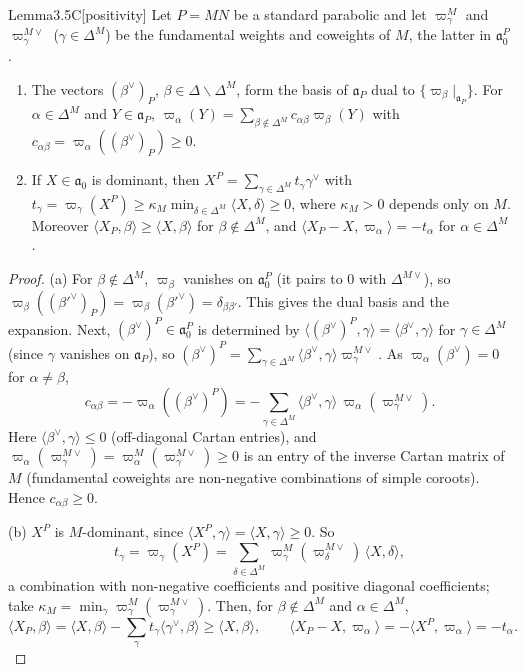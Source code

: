 \documentclass[12pt,letterpaper]{article}
\numberwithin{equation}{section}
\theoremstyle{plain}
\theoremstyle{remark}
\theoremstyle{plain}
\theoremstyle{definition}
\theoremstyle{remark}
\theoremstyle{remark}
\newcommand{\fa}{\mathfrak{a}}
\newcommand{\ip}[1]{\langle #1\rangle}
\begin{document}
\begin{fixedplain}{Lemma}{3.5C}[positivity]\label{lem:3.5C}
Let $P=MN$ be a standard parabolic and let $\varpi^{M}_\gamma$ and $\varpi^{M\vee}_\gamma$ ($\gamma\in\Delta^M$) be the fundamental weights and coweights of $M$, the latter in $\fa_0^P$.
\begin{enumerate}[label=(\alph*)]
\item The vectors $(\beta^\vee)_P$, $\beta\in\Delta\smallsetminus\Delta^M$, form the basis of $\fa_P$ dual to $\{\varpi_\beta|_{\fa_P}\}$. For $\alpha\in\Delta^M$ and $Y\in\fa_P$, $\varpi_\alpha(Y)=\sum_{\beta\notin\Delta^M}c_{\alpha\beta}\varpi_\beta(Y)$ with $c_{\alpha\beta}=\varpi_\alpha((\beta^\vee)_P)\ge0$.
\item If $X\in\fa_0$ is dominant, then $X^P=\sum_{\gamma\in\Delta^M}t_\gamma\gamma^\vee$ with $t_\gamma=\varpi_\gamma(X^P)\ge\kappa_M\min_{\delta\in\Delta^M}\ip{X,\delta}\ge0$, where $\kappa_M>0$ depends only on $M$. Moreover $\ip{X_P,\beta}\ge\ip{X,\beta}$ for $\beta\notin\Delta^M$, and $\ip{X_P-X,\varpi_\alpha}=-t_\alpha$ for $\alpha\in\Delta^M$.
\end{enumerate}
\end{fixedplain}

\begin{proof}
(a) For $\beta\notin\Delta^M$, $\varpi_\beta$ vanishes on $\fa_0^P$ (it pairs to $0$ with $\Delta^{M\vee}$), so $\varpi_\beta((\beta'^\vee)_P)=\varpi_\beta(\beta'^\vee)=\delta_{\beta\beta'}$. This gives the dual basis and the expansion. Next, $(\beta^\vee)^P\in\fa_0^P$ is determined by $\ip{(\beta^\vee)^P,\gamma}=\ip{\beta^\vee,\gamma}$ for $\gamma\in\Delta^M$ (since $\gamma$ vanishes on $\fa_P$), so $(\beta^\vee)^P=\sum_{\gamma\in\Delta^M}\ip{\beta^\vee,\gamma}\varpi^{M\vee}_\gamma$. As $\varpi_\alpha(\beta^\vee)=0$ for $\alpha\ne\beta$,
\[
c_{\alpha\beta}=-\varpi_\alpha((\beta^\vee)^P)=-\sum_{\gamma\in\Delta^M}\ip{\beta^\vee,\gamma}\,\varpi_\alpha(\varpi^{M\vee}_\gamma).
\]
Here $\ip{\beta^\vee,\gamma}\le0$ (off-diagonal Cartan entries), and $\varpi_\alpha(\varpi^{M\vee}_\gamma)=\varpi^M_\alpha(\varpi^{M\vee}_\gamma)\ge0$ is an entry of the inverse Cartan matrix of $M$ (fundamental coweights are non-negative combinations of simple coroots). Hence $c_{\alpha\beta}\ge0$.

(b) $X^P$ is $M$-dominant, since $\ip{X^P,\gamma}=\ip{X,\gamma}\ge0$. So
\[
t_\gamma=\varpi_\gamma(X^P)=\sum_{\delta\in\Delta^M}\varpi^M_\gamma(\varpi^{M\vee}_\delta)\,\ip{X,\delta},
\]
a combination with non-negative coefficients and positive diagonal coefficients; take $\kappa_M=\min_\gamma\varpi^M_\gamma(\varpi^{M\vee}_\gamma)$. Then, for $\beta\notin\Delta^M$ and $\alpha\in\Delta^M$,
\[
\ip{X_P,\beta}=\ip{X,\beta}-\sum_\gamma t_\gamma\ip{\gamma^\vee,\beta}\ge\ip{X,\beta},\qquad\ip{X_P-X,\varpi_\alpha}=-\ip{X^P,\varpi_\alpha}=-t_\alpha.
\]
\end{proof}
\end{document}
